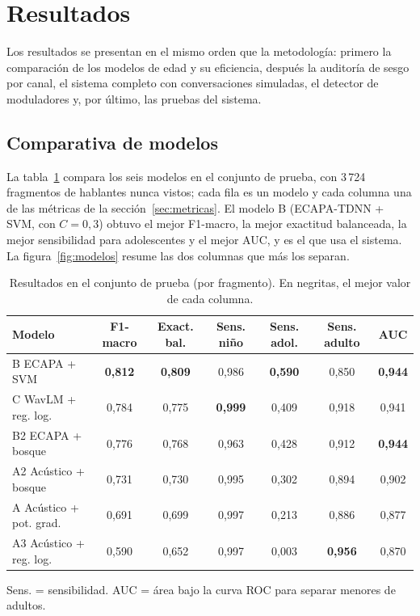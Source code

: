 \documentclass[11pt,a4paper]{article}
\begin{document}
\section{Resultados}

Los resultados se presentan en el mismo orden que la metodología: primero la comparación de los modelos de edad y su eficiencia, después la auditoría de sesgo por canal, el sistema completo con conversaciones simuladas, el detector de moduladores y, por último, las pruebas del sistema.

\subsection{Comparativa de modelos}

La tabla~\ref{tab:resultados} compara los seis modelos en el conjunto de prueba, con 3\,724 fragmentos de hablantes nunca vistos; cada fila es un modelo y cada columna una de las métricas de la sección~\ref{sec:metricas}. El modelo B (ECAPA-TDNN + SVM, con $C = 0{,}3$) obtuvo el mejor F1-macro, la mejor exactitud balanceada, la mejor sensibilidad para adolescentes y el mejor AUC, y es el que usa el sistema. La figura~\ref{fig:modelos} resume las dos columnas que más los separan.

\begin{table}[H]
\centering
\caption{Resultados en el conjunto de prueba (por fragmento). En negritas, el mejor valor de cada columna.}
\label{tab:resultados}
\footnotesize
\setlength{\tabcolsep}{4pt}
\begin{tabular}{@{}lcccccc@{}}
\toprule
\textbf{Modelo} & \textbf{F1-macro} & \textbf{Exact. bal.} & \textbf{Sens. niño} & \textbf{Sens. adol.} & \textbf{Sens. adulto} & \textbf{AUC} \\
\midrule
B ECAPA + SVM          & \textbf{0,812} & \textbf{0,809} & 0,986 & \textbf{0,590} & 0,850 & \textbf{0,944} \\
C WavLM + reg. log.    & 0,784 & 0,775 & \textbf{0,999} & 0,409 & 0,918 & 0,941 \\
B2 ECAPA + bosque      & 0,776 & 0,768 & 0,963 & 0,428 & 0,912 & \textbf{0,944} \\
A2 Acústico + bosque   & 0,731 & 0,730 & 0,995 & 0,302 & 0,894 & 0,902 \\
A Acústico + pot. grad.& 0,691 & 0,699 & 0,997 & 0,213 & 0,886 & 0,877 \\
A3 Acústico + reg. log.& 0,590 & 0,652 & 0,997 & 0,003 & \textbf{0,956} & 0,870 \\
\bottomrule
\end{tabular}

\vspace{2pt}
{\footnotesize Sens. = sensibilidad. AUC = área bajo la curva ROC para separar menores de adultos.}
\end{table}
\end{document}
